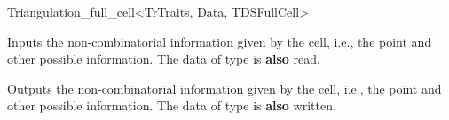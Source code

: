\begin{ccRefClass}{Triangulation_full_cell<TrTraits, Data, TDSFullCell>}

\ccGlue{}


%
{Inputs the non-combinatorial information given by the cell, {i.e.},
the point and other possible information. The data of type  is
\textbf{also} read.}

%
{Outputs the non-combinatorial information given by the cell, {i.e.},
the point and other possible information. The data of type  is
\textbf{also} written.}

\ccSeeAlso


\end{ccRefClass}

